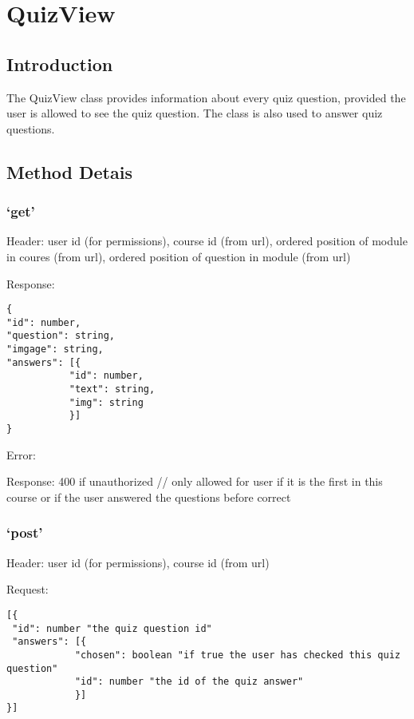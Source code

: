 \chapter*{QuizView}

\section*{Introduction}\label{introduction}

The QuizView class provides information about every quiz
question, provided the user is allowed to see the quiz question. The
class is also used to answer quiz questions.

\section*{Method Detais}\label{method-detais}

\subsection*{\texorpdfstring{`get'}{get}}\label{get}

Header: user id (for permissions), course id (from url), ordered
position of module in coures (from url), ordered position of question in
module (from url)

Response:

\begin{verbatim}
{
"id": number,
"question": string,
"imgage": string,
"answers": [{
           "id": number,
           "text": string,
           "img": string
           }]
}
\end{verbatim}

Error:

Response: 400 if unauthorized // only allowed for user if it is the
first in this course or if the user answered the questions before
correct

\subsection*{\texorpdfstring{`post'}{post}}\label{post}

Header: user id (for permissions), course id (from url)

Request:

\begin{verbatim}
[{
 "id": number "the quiz question id"
 "answers": [{
            "chosen": boolean "if true the user has checked this quiz question"
            "id": number "the id of the quiz answer"
            }]
}]
\end{verbatim}


